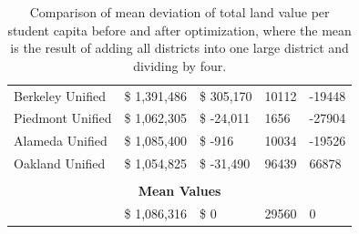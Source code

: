 \documentclass{article}
\begin{document}
\begin{table}[H]
\begin{tabular}{l|ll|ll}
         Berkeley Unified   & \$ 1,391,486                                & \$ 305,170      & 10112  & -19448 \\
         Piedmont Unified   & \$ 1,062,305                                & \$ -24,011      & 1656   & -27904 \\ 
         Alameda Unified    & \$ 1,085,400                                & \$ -916         & 10034  & -19526  \\ 
         Oakland Unified    & \$ 1,054,825                                & \$ -31,490      & 96439  &  66878 \\
         \multicolumn{5}{c}{} \\
         \multicolumn{5}{c}{\textbf{Mean Values}} \\ \hline
                            & \$ 1,086,316                                & \$ 0            & 29560  &  0 \\
    \end{tabular}
    \caption{Comparison of mean deviation of total land value per student capita before and after optimization, where the mean is the result of adding all districts into one large district and dividing by four.}
    \label{tab:optimization-comparision}
\end{table}




\end{document}
